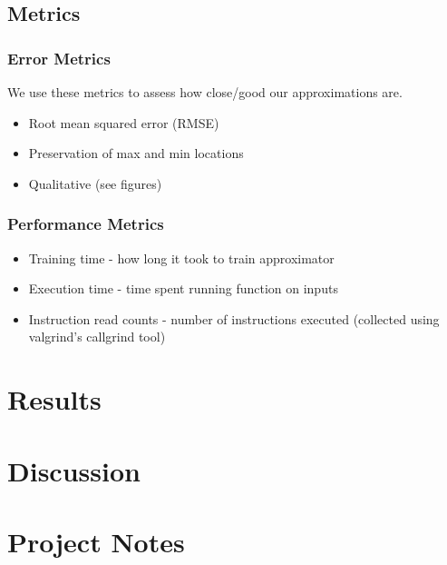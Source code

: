\documentclass{article}
\begin{document}
\subsection{Metrics}

\subsubsection{Error Metrics}
We use these metrics to assess how close/good our approximations are.

\begin{itemize}
\item Root mean squared error (RMSE)
\item Preservation of max and min locations
\item Qualitative (see figures)
\end{itemize}

\subsubsection{Performance Metrics}
\begin{itemize}
\item Training time - how long it took to train approximator
\item Execution time - time spent running function on inputs
\item Instruction read counts - number of instructions executed (collected using valgrind's callgrind tool)
\end{itemize}

\section{Results}


\section{Discussion}

\section{Project Notes}



\end{document}
